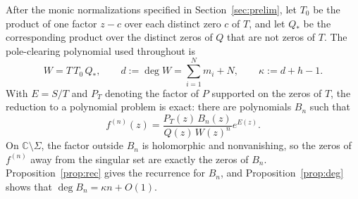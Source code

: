 \documentclass[reqno]{article}
\theoremstyle{definition}
\theoremstyle{remark}
\theoremstyle{plain}
\newcommand{\C}{\mathbb C}
\begin{document}
After the monic normalizations specified in Section~\ref{sec:prelim}, let $T_0$ be the product of one factor $z-c$ over each distinct zero $c$ of $T$, and let $Q_\ast$ be the corresponding product over the distinct zeros of $Q$ that are not zeros of $T$. The pole-clearing polynomial used throughout is
\[
W=T\,T_0\,Q_\ast,
\qquad
 d:=\deg W=\sum_{i=1}^N m_i+N,
\qquad
\kappa:=d+h-1.
\]
With $E=S/T$ and $P_T$ denoting the factor of $P$ supported on the zeros of $T$, the reduction to a polynomial problem is exact: there are polynomials $B_n$ such that
\begin{equation}\label{eq:nthder}
f^{(n)}(z)=\frac{P_T(z)\,B_n(z)}{Q(z)\,W(z)^n}e^{E(z)}.
\end{equation}
On $\C\setminus\Sigma$, the factor outside $B_n$ is holomorphic and nonvanishing, so the zeros of $f^{(n)}$ away from the singular set are exactly the zeros of $B_n$. Proposition~\ref{prop:rec} gives the recurrence for $B_n$, and Proposition~\ref{prop:deg} shows that $\deg B_n=\kappa n+O(1)$.
\end{document}
